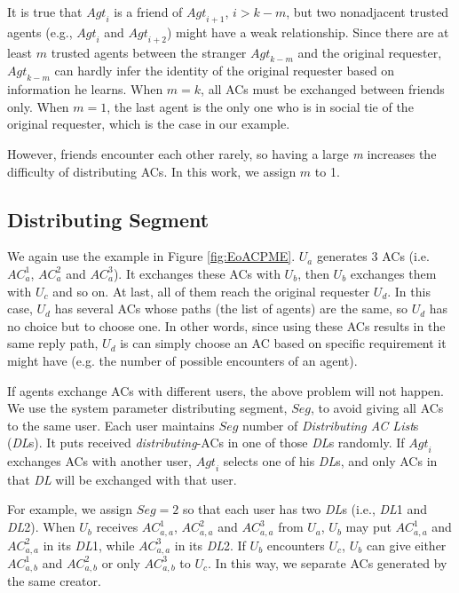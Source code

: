 \documentclass[conference]{IEEEtran}
\begin{document}
It is true that ${Agt}_i$ is a friend of ${Agt}_{i+1}$, $i>k-m$, but two nonadjacent trusted agents (e.g., ${Agt}_i$ and ${Agt}_{i+2}$) might have a weak relationship. Since there are at least $m$ trusted agents between the stranger ${Agt}_{k-m}$ and the original requester, ${Agt}_{k-m}$ can hardly infer the identity of the original requester based on information he learns. When $m=k$, all ACs must be exchanged between friends only. When $m=1$, the last agent is the only one who is in social tie of the original requester, which is the case in our example.

However, friends encounter each other rarely, so having a large \textit{m} increases the difficulty of distributing ACs. In this work, we assign $m$ to 1.



\subsection{ Distributing Segment}

\noindent We again use the example in Figure \ref{fig:EoACPME}. $U_a$ generates 3 ACs (i.e. ${AC}^1_a$, ${AC}^2_a$ and ${AC}^3_a$). It exchanges these ACs with $U_b$, then $U_b$ exchanges them with $U_c$ and so on. At last, all of them reach the original requester $U_d$. In this case, $U_d$ has several ACs whose paths (the list of agents) are the same, so $U_d$ has no choice but to choose one. In other words, since using these ACs results in the same reply path, $U_d$ is can simply choose an AC based on specific requirement it might have (e.g. the number of possible encounters of an agent). 

If agents exchange ACs with different users, the above problem will not happen. We use the system parameter distributing segment, $Seg$, to avoid giving all ACs to the same user. Each user maintains $Seg$ number of \textit{Distributing AC List}s (\textit{DL}s). It puts received \textit{distributing}-ACs in one of those \textit{DL}s randomly. If ${Agt}_i$ exchanges ACs with another user, ${Agt}_i$ selects one of his \textit{DL}s, and only ACs in that \textit{DL} will be exchanged with that user.

For example, we assign $Seg=2$ so that each user has two \textit{DL}s (i.e., \textit{DL}1 and \textit{DL}2). When $U_b$ receives ${AC}^1_{a,a}$, ${AC}^2_{a,a}$ and ${AC}^3_{a,a}$ from $U_a$, $U_b$ may put ${AC}^1_{a,a}$ and ${AC}^2_{a,a}$ in its \textit{DL}1, while ${AC}^3_{a,a}$ in its \textit{DL}2. If $U_b$ encounters $U_c$, $U_b$ can give either ${AC}^1_{a,b}$ and ${AC}^2_{a,b}$ or only ${AC}^3_{a,b}$ to $U_c$. In this way, we separate ACs generated by the same creator.
\end{document}
